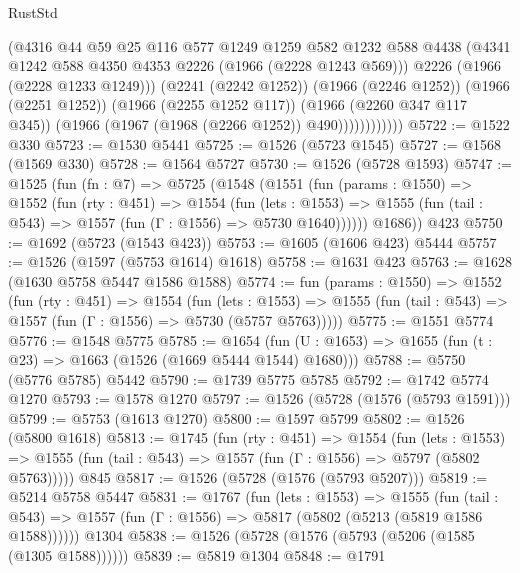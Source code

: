\begin{lexlean}{RustStd}
\begin{coremodule}
                        (@4316
                          @44
                          @59
                          @25
                          @116
                          @577
                          @1249
                          @1259
                          @582
                          @1232
                          @588
                          @4438
                          (@4341 @1242 @588 @4350 @4353 @2226 (@1966 (@2228 @1243 @569)))
                          @2226
                          (@1966 (@2228 @1233 @1249)))
                        (@2241 (@2242 @1252))
                        (@1966 (@2246 @1252))
                        (@1966 (@2251 @1252))
                        (@1966 (@2255 @1252 @117))
                        (@1966 (@2260 @347 @117 @345))
                        (@1966 (@1967 (@1968 (@2266 @1252)) @490))))))))))))
@5722 := @1522 @330
@5723 := @1530 @5441
@5725 := @1526 (@5723 @1545)
@5727 := @1568 (@1569 @330)
@5728 := @1564 @5727
@5730 := @1526 (@5728 @1593)
@5747 := @1525
    (fun (fn : @7) =>
    @5725
      (@1548
        (@1551
          (fun (params : @1550) =>
          @1552
            (fun (rty : @451) =>
            @1554
              (fun (lets : @1553) =>
              @1555 (fun (tail : @543) => @1557 (fun (Γ : @1556) => @5730 @1640))))))
        @1686))
    @423
@5750 := @1692 (@5723 (@1543 @423))
@5753 := @1605 (@1606 @423) @5444
@5757 := @1526 (@1597 (@5753 @1614) @1618)
@5758 := @1631 @423
@5763 := @1628 (@1630 @5758 @5447 @1586 @1588)
@5774 := fun (params : @1550) =>
  @1552
    (fun (rty : @451) =>
    @1554
      (fun (lets : @1553) =>
      @1555 (fun (tail : @543) => @1557 (fun (Γ : @1556) => @5730 (@5757 @5763)))))
@5775 := @1551 @5774
@5776 := @1548 @5775
@5785 := @1654 (fun (U : @1653) => @1655 (fun (t : @23) => @1663 (@1526 (@1669 @5444 @1544) @1680)))
@5788 := @5750 (@5776 @5785) @5442
@5790 := @1739 @5775 @5785
@5792 := @1742 @5774 @1270
@5793 := @1578 @1270
@5797 := @1526 (@5728 (@1576 (@5793 @1591)))
@5799 := @5753 (@1613 @1270)
@5800 := @1597 @5799
@5802 := @1526 (@5800 @1618)
@5813 := @1745
    (fun (rty : @451) =>
    @1554
      (fun (lets : @1553) =>
      @1555 (fun (tail : @543) => @1557 (fun (Γ : @1556) => @5797 (@5802 @5763)))))
    @845
@5817 := @1526 (@5728 (@1576 (@5793 @5207)))
@5819 := @5214 @5758 @5447
@5831 := @1767
    (fun (lets : @1553) =>
    @1555
      (fun (tail : @543) => @1557 (fun (Γ : @1556) => @5817 (@5802 (@5213 (@5819 @1586 @1588))))))
    @1304
@5838 := @1526 (@5728 (@1576 (@5793 (@5206 (@1585 (@1305 @1588))))))
@5839 := @5819 @1304
@5848 := @1791

\end{coremodule}
\end{lexlean}

